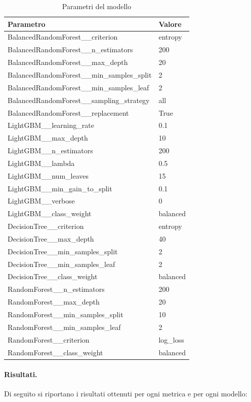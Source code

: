 \begin{table}[H]
\centering
\begin{tabular}{|l|l|}
\toprule
\textbf{Parametro}                 & \textbf{Valore} \\ \midrule
BalancedRandomForest\_\_criterion & entropy \\ 
BalancedRandomForest\_\_n\_estimators & 200 \\
BalancedRandomForest\_\_max\_depth & 20 \\
BalancedRandomForest\_\_min\_samples\_split & 2 \\
BalancedRandomForest\_\_min\_samples\_leaf & 2 \\
BalancedRandomForest\_\_sampling\_strategy & all \\
BalancedRandomForest\_\_replacement & True \\
LightGBM\_\_learning\_rate & 0.1 \\
LightGBM\_\_max\_depth & 10 \\
LightGBM\_\_n\_estimators & 200 \\
LightGBM\_\_lambda & 0.5 \\
LightGBM\_\_num\_leaves & 15 \\
LightGBM\_\_min\_gain\_to\_split & 0.1 \\
LightGBM\_\_verbose & 0 \\
LightGBM\_\_class\_weight & balanced \\
DecisionTree\_\_criterion & entropy \\
DecisionTree\_\_max\_depth & 40 \\
DecisionTree\_\_min\_samples\_split & 2 \\
DecisionTree\_\_min\_samples\_leaf & 2 \\
DecisionTree\_\_class\_weight & balanced \\
RandomForest\_\_n\_estimators & 200 \\
RandomForest\_\_max\_depth & 20 \\
RandomForest\_\_min\_samples\_split & 10 \\
RandomForest\_\_min\_samples\_leaf & 2 \\
RandomForest\_\_criterion & log\_loss \\
RandomForest\_\_class\_weight & balanced \\ \bottomrule
\end{tabular}
\caption{Parametri del modello}
\end{table}

\paragraph{Risultati.} Di seguito si riportano i risultati ottenuti per ogni metrica e per ogni modello:

